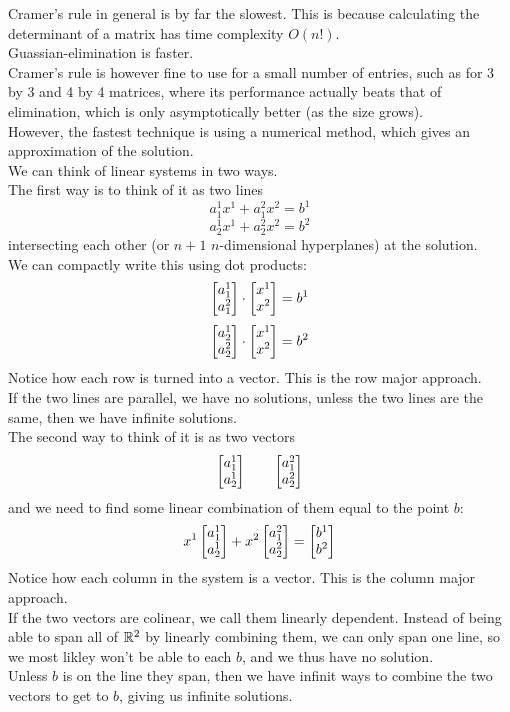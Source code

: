 \documentclass[12pt]{article}
\begin{document}
    Cramer's rule in general is by far the slowest.
    This is because calculating the determinant of
    a matrix has time complexity $O(n!)$. \\
    Guassian-elimination is faster. \\
    Cramer's rule is however fine to use
    for a small number of entries,
    such as for 3 by 3 and 4 by 4 matrices,
    where its performance actually beats
    that of elimination, which is only asymptotically
    better (as the size grows). \\
    However, the fastest technique is using
    a numerical method, which gives an approximation
    of the solution. \\

    We can think of linear systems in two ways. \\

    The first way is to think of it as two lines
    \[ a_1^1x^1 + a_1^2x^2 = b^1 \]
    \[ a_2^1x^1 + a_2^2x^2 = b^2 \]
    intersecting each other (or $n+1$ $n$-dimensional hyperplanes)
    at the solution. \\
    We can compactly write this using dot products:
    \[ \begin{bmatrix} a_1^1 \\ a_1^2 \end{bmatrix} \cdot \begin{bmatrix} x^1 \\ x^2 \end{bmatrix}
    = b^1 \]
    \[ \begin{bmatrix} a_2^1 \\ a_2^2 \end{bmatrix} \cdot \begin{bmatrix} x^1 \\ x^2 \end{bmatrix}
    = b^2 \]
    Notice how each row is turned into a vector.
    This is the row major approach. \\
    If the two lines are parallel, we have no solutions,
    unless the two lines are the same, then we have
    infinite solutions. \\

    The second way to think of it is as two vectors
    \[ \begin{bmatrix} a_1^1 \\ a_2^1 \end{bmatrix} \qquad \begin{bmatrix} a_1^2 \\ a_2^2 \end{bmatrix} \]
    and we need to find some linear combination of them
    equal to the point $b$: 
    \[ x^1\begin{bmatrix} a_1^1 \\ a_2^1 \end{bmatrix} + x^2\begin{bmatrix} a_1^2 \\ a_2^2 \end{bmatrix}
    = \begin{bmatrix} b^1 \\ b^2 \end{bmatrix} \]
    Notice how each column in the system is a vector.
    This is the column major approach. \\
    If the two vectors are colinear,
    we call them linearly dependent.
    Instead of being able to span all of $\mathbb{R}^2$
    by linearly combining them, we can only span one line,
    so we most likley won't be able to each $b$,
    and we thus have no solution. \\
    Unless $b$ is on the line they span,
    then we have infinit ways to combine the two vectors
    to get to $b$, giving us infinite solutions. \\
\end{document}
